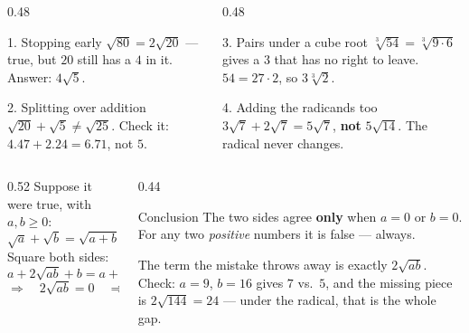 \documentclass[aspectratio=169, 11pt]{beamer}
\begin{document}
\begin{frame}[t, plain]
  \begin{columns}[T]
    \begin{column}{0.48\textwidth}
      \footnotesize
      \begin{block}{1. Stopping early}
        $\sqrt{80}=2\sqrt{20}$ --- true, but $20$ still has a $4$ in it. Answer: $4\sqrt5$.
      \end{block}
      \vspace{4pt}
      \begin{block}{2. Splitting over addition}
        $\sqrt{20}+\sqrt5\ne\sqrt{25}$. \; Check it: $4.47+2.24=6.71$, not $5$.
      \end{block}
    \end{column}
    \begin{column}{0.48\textwidth}
      \footnotesize
      \begin{block}{3. Pairs under a cube root}
        $\sqrt[3]{54}=\sqrt[3]{9\cdot6}$ gives a $3$ that has no right to leave. \;
        $54=27\cdot2$, so $3\sqrt[3]{2}$.
      \end{block}
      \vspace{4pt}
      \begin{block}{4. Adding the radicands too}
        $3\sqrt7+2\sqrt7=5\sqrt7$, \textbf{not} $5\sqrt{14}$. The radical never changes.
      \end{block}
    \end{column}
  \end{columns}
\end{frame}

\begin{frame}[t, plain]
  \begin{columns}[T]
    \begin{column}{0.52\textwidth}
      Suppose it were true, with $a,b\ge0$:
      \[ \sqrt a+\sqrt b=\sqrt{a+b} \]
      Square both sides:
      \[ a+2\sqrt{ab}+b = a+b \]
      \[ \Rightarrow\quad 2\sqrt{ab}=0 \quad\Rightarrow\quad ab=0 \]
    \end{column}
    \begin{column}{0.44\textwidth}
      \begin{block}{Conclusion}
        The two sides agree \textbf{only} when $a=0$ or $b=0$. For any two \emph{positive} numbers
        it is false --- always.
      \end{block}
      \vspace{4pt}
      {\footnotesize The term the mistake throws away is exactly $2\sqrt{ab}$. \\[4pt]
      Check: $a=9$, $b=16$ gives $7$ vs.\ $5$, and the missing piece is
      $2\sqrt{144}=24$ --- under the radical, that is the whole gap.}
    \end{column}
  \end{columns}
\end{frame}
\end{document}
